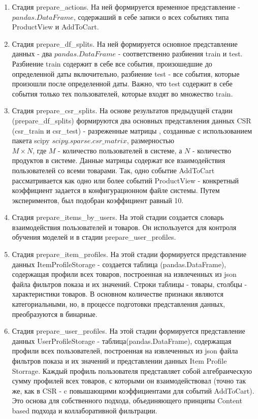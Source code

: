 \documentclass[14pt]{mmcs_article}
\newenvironment{myenumerate}
{ \begin{enumerate}
		\setlength{\itemsep}{0pt}
		\setlength{\parskip}{0pt}
		\setlength{\parsep}{0pt}     }
	{ \end{enumerate}                  }
\begin{document}
\begin{myenumerate}
	\item Стадия prepare\_actions. На ней формируется временное представление - $pandas$.$DataFrame$, содержаший в себе записи о всех событиях типа  ProductView и AddToCart.
	\item Стадия prepare\_df\_splits. На ней формируется основное представление данных - два  $pandas$.$DataFrame$ - соответственно разбиения train и test. Разбиение train содержит в себе все события, произошедшие до определенной даты включительно, разбиение test - все события, которые произошли после определенной даты. Важно, что test содержит в себе события только тех пользователей, которые входят во множество train. 
	\item Стадия prepare\_csr\_splits. На основе результатов предыдущей стадии  (prepare\_df\_splits) формируются два основных представления данных CSR (csr\_train и csr\_test) - разреженные матрицы , созданные с использованием пакета scipy $scipy$.$sparse$.$csr\_matrix$, размерностью \\ $M \times N$, где $M$ - количество пользователей в системе, а $N$ - количество продуктов в системе. Данные матрицы содержат все взаимодействия пользователей со всеми товарами. Так, одно событие AddToCart рассматривается как одно или более событий ProductView - конкретный коэффициент задается в конфигурационном файле системы. Путем экспериментов, был подобран коэффициент равный 10.
	\item Стадия prepare\_items\_by\_users. На этой стадии создается словарь взаимодействия пользователей и товаров. Он используется для контроля обучения моделей и в стадии prepare\_user\_profiles.
	\item Стадия prepare\_item\_profiles. На этой стадии формируется представление данных ItemProfileStorage - создается таблица (pandas.DataFrame), содержащая профили всех товаров, построенная на извлеченных из json файла фильтров показа и их значений. Строки таблицы - товары, столбцы - характеристики товаров. В основном количестве признаки являются категориальными, но, в процессе подготовки представления данных, преобразуются в бинарные.
	\item Стадия prepare\_user\_profiles. На этой стадии формируется представление данных UserProfileStorage - таблица(pandas.DataFrame), содержащая профили всех пользователей, построенная на извлеченных из json файла фильтров показа и их значений и представлении данных Item Profile Storrage. Каждый профиль пользователя представляет собой алгебраическую сумму профилей всех товаров, с которыми он взаимодействовал (точно так же, как в CSR - c повышающими коэффициентами для событий AddToCart). Это основа для собственного подхода, объединяющего принципы Content based подхода и коллаборативной фильтрации.
	
\end{myenumerate}
\end{document}

